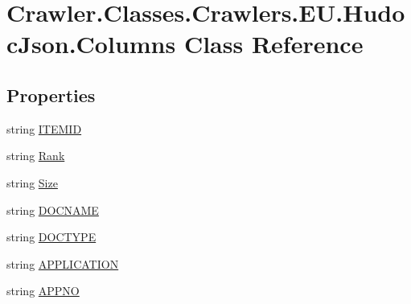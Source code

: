 \hypertarget{class_crawler_1_1_classes_1_1_crawlers_1_1_e_u_1_1_hudoc_json_1_1_columns}{\section{Crawler.\-Classes.\-Crawlers.\-E\-U.\-Hudoc\-Json.\-Columns Class Reference}
\label{class_crawler_1_1_classes_1_1_crawlers_1_1_e_u_1_1_hudoc_json_1_1_columns}
}
\subsection*{Properties}
\begin{DoxyCompactItemize}
\item 
string \hyperlink{class_crawler_1_1_classes_1_1_crawlers_1_1_e_u_1_1_hudoc_json_1_1_columns_af59511c6bbb27e6f14f462e59f7189ba}{I\-T\-E\-M\-I\-D}
\item 
string \hyperlink{class_crawler_1_1_classes_1_1_crawlers_1_1_e_u_1_1_hudoc_json_1_1_columns_aa04c9bc46a076fb531fb58345269dbf9}{Rank}
\item 
string \hyperlink{class_crawler_1_1_classes_1_1_crawlers_1_1_e_u_1_1_hudoc_json_1_1_columns_a9aad56f4c0e0ead701a43051af413c34}{Size}
\item 
string \hyperlink{class_crawler_1_1_classes_1_1_crawlers_1_1_e_u_1_1_hudoc_json_1_1_columns_abbb3dc46b9abfb5ca9c198809872716d}{D\-O\-C\-N\-A\-M\-E}
\item 
string \hyperlink{class_crawler_1_1_classes_1_1_crawlers_1_1_e_u_1_1_hudoc_json_1_1_columns_a2ddb165d3820fda08f0191a80ff47772}{D\-O\-C\-T\-Y\-P\-E}
\item 
string \hyperlink{class_crawler_1_1_classes_1_1_crawlers_1_1_e_u_1_1_hudoc_json_1_1_columns_ab3459c74a2b5d86095aa83cc489d09ba}{A\-P\-P\-L\-I\-C\-A\-T\-I\-O\-N}
\item 
string \hyperlink{class_crawler_1_1_classes_1_1_crawlers_1_1_e_u_1_1_hudoc_json_1_1_columns_ab8c6275a4cc2417318144e00dac2dd2e}{A\-P\-P\-N\-O}

\end{DoxyCompactItemize}
